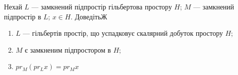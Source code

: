 \begin{exercise}
    Нехай $L$ --- замкнений підпростір гільбертова простору $H$; $M$ --- замкнений підпростір
    в $L$; $x \in H$. ДоведітьЖ
    \begin{enumerate}[\label = \ukr*)]
        \item $L$ --- гільбертів простір, що успадковує скалярний добуток простору $H$;
        \item $M$ є замкненим підпростором в $H$;
        \item $pr_M (pr_L x) = pr_M x$
    \end{enumerate}
\end{exercise}

